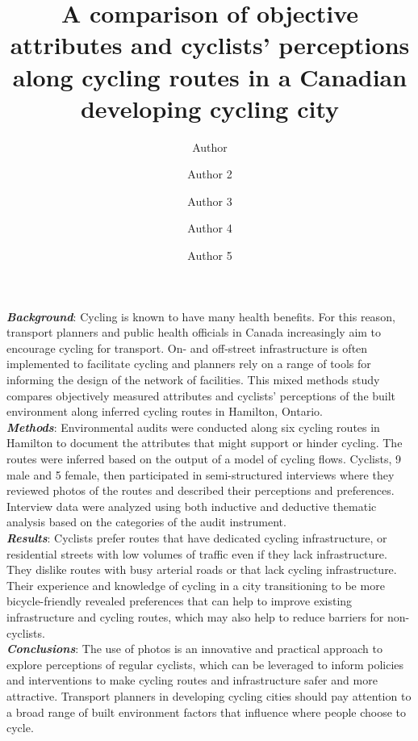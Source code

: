 \documentclass[]{elsarticle} %
\begin{document}
\begin{frontmatter}

  \title{A comparison of objective attributes and cyclists' perceptions along
cycling routes in a Canadian developing cycling city}
    \author[Some School]{Author}
    \author[Some Department]{Author 2}
    \author[Some School]{Author 3}
    \author[Another Department]{Author 4}
    \author[Some School]{Author 5}
      \address[Some School]{School of X}
    \address[Some Department]{Department of Y}
    \address[Another Department]{Department of Z}
    
  \begin{abstract}
  
  \end{abstract}
  
 \end{frontmatter}

\textbf{\emph{Background}}: Cycling is known to have many health
benefits. For this reason, transport planners and public health
officials in Canada increasingly aim to encourage cycling for transport.
On- and off-street infrastructure is often implemented to facilitate
cycling and planners rely on a range of tools for informing the design
of the network of facilities. This mixed methods study compares
objectively measured attributes and cyclists' perceptions of the built
environment along inferred cycling routes in Hamilton, Ontario.\\
\textbf{\emph{Methods}}: Environmental audits were conducted along six
cycling routes in Hamilton to document the attributes that might support
or hinder cycling. The routes were inferred based on the output of a
model of cycling flows. Cyclists, 9 male and 5 female, then participated
in semi-structured interviews where they reviewed photos of the routes
and described their perceptions and preferences. Interview data were
analyzed using both inductive and deductive thematic analysis based on
the categories of the audit instrument.\\
\textbf{\emph{Results}}: Cyclists prefer routes that have dedicated
cycling infrastructure, or residential streets with low volumes of
traffic even if they lack infrastructure. They dislike routes with busy
arterial roads or that lack cycling infrastructure. Their experience and
knowledge of cycling in a city transitioning to be more bicycle-friendly
revealed preferences that can help to improve existing infrastructure
and cycling routes, which may also help to reduce barriers for
non-cyclists.\\
\textbf{\emph{Conclusions}}: The use of photos is an innovative and
practical approach to explore perceptions of regular cyclists, which can
be leveraged to inform policies and interventions to make cycling routes
and infrastructure safer and more attractive. Transport planners in
developing cycling cities should pay attention to a broad range of built
environment factors that influence where people choose to cycle.
\end{document}
